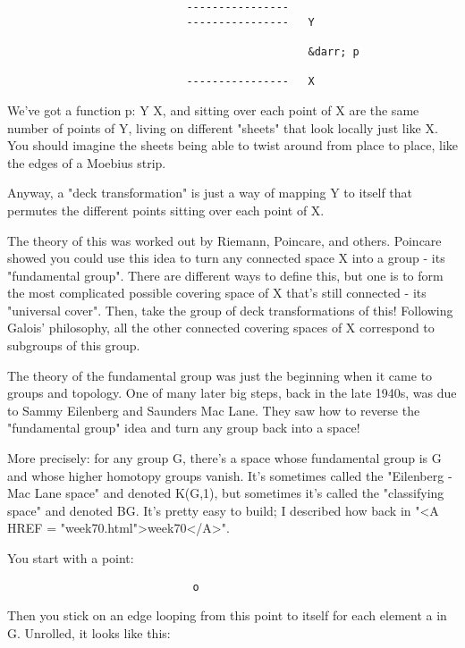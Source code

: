 \begin{verbatim}
                            ----------------   
                            ----------------   Y 
                                               
                                               &darr; p
                                               
                            ----------------   X
\end{verbatim}
    
We've got a function p: Y \to  X, and sitting over each point of X are 
the same number of points of Y, living on different "sheets" that look
locally just like X.   You should imagine the sheets being able to 
twist around from place to place, like the edges of a Moebius strip.

Anyway, a "deck transformation" is just a way of mapping Y to itself 
that permutes the different points sitting over each point of X.  

The theory of this was worked out by Riemann, Poincare, and others.  
Poincare showed you could use this idea to turn any connected space X 
into a group - its "fundamental group".  There are different ways to
define this, but one is to form the most complicated possible 
covering space of X that's still connected - its "universal cover".
Then, take the group of deck transformations of this!  Following 
Galois' philosophy, all the other connected covering spaces of X 
correspond to subgroups of this group.  

The theory of the fundamental group was just the beginning when 
it came to groups and topology.  One of many later big steps, back 
in the late 1940s, was due to Sammy Eilenberg and Saunders Mac Lane.  
They saw how to reverse the "fundamental group" idea and turn any 
group back into a space!   

More precisely: for any group G, there's a space whose fundamental group
is G and whose higher homotopy groups vanish.  It's sometimes called the 
"Eilenberg - Mac Lane space" and denoted K(G,1), but sometimes it's called
the "classifying space" and denoted BG.  It's pretty easy to build; 
I described how back in "<A HREF = "week70.html">week70</A>".  

You start with a point:

\begin{verbatim}
                             o
\end{verbatim}
    
Then you stick on an edge looping from this point to itself for
each element a in G.   Unrolled, it looks like this: 

